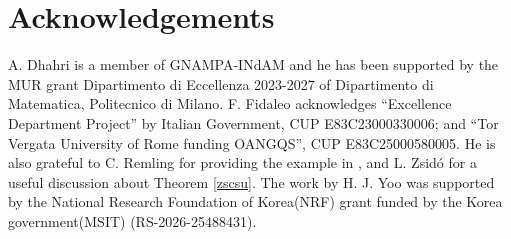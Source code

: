 \documentclass[12pt]{amsart}
\numberwithin{equation}{section}
\begin{document}
\section*{Acknowledgements}
A. Dhahri is a member of GNAMPA-INdAM and he has been supported by the MUR grant Dipartimento
di Eccellenza 2023-2027 of Dipartimento di Matematica, Politecnico di Milano. F. Fidaleo acknowledges ``Excellence Department Project'' by Italian Government, CUP E83C23000330006; and ``Tor Vergata University of Rome funding OANGQS'', CUP E83C25000580005. He is also grateful to C. Remling for providing the example in \cite{Re}, and L. Zsid\'o for a useful discussion about Theorem \ref{zscsu}. The work by H. J. Yoo was supported by the National Research Foundation of Korea(NRF) grant funded by the Korea government(MSIT) (RS-2026-25488431).
\end{document}
